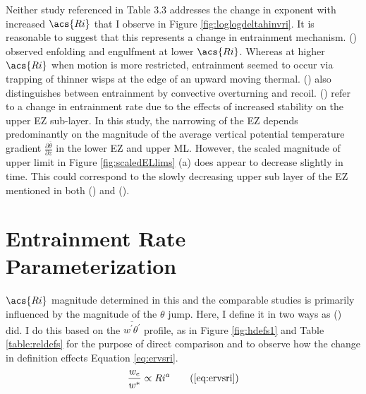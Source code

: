 Neither study referenced in Table 3.3 addresses the change in exponent with increased $\acs{Ri}$ that I observe in Figure \ref{fig:loglogdeltahinvri}.  It is reasonable to suggest that this represents a change in entrainment mechanism. \citeauthor{SullMoengStev} (\citeyear{SullMoengStev}) observed enfolding and engulfment at lower $\acs{Ri}$.  Whereas at higher $\acs{Ri}$ when motion is more restricted, entrainment seemed to occur via trapping of thinner wisps at the edge of an upward moving thermal.  \citeauthor{Turner86} (\citeyear{Turner86}) also distinguishes between entrainment by convective overturning and recoil. \citeauthor{GarciaMellado} (\citeyear{GarciaMellado}) refer to a change in entrainment rate due to the effects of increased stability on the upper \acs{EZ} sub-layer.  In this study, the narrowing of the \acs{EZ} depends predominantly on the magnitude of the average vertical potential temperature gradient $\frac{\partial \overline{\theta}}{\partial z}$ in the lower \acs{EZ} and upper \acs{ML}.  However, the scaled magnitude of upper limit in Figure \ref{fig:scaledELlims} (a) does appear to decrease slightly in time.  This could correspond to the slowly decreasing upper sub layer of the \acs{EZ} mentioned in both \citeauthor{GarciaMellado} (\citeyear{GarciaMellado}) and \citeauthor{FedConzMir04} (\citeyear{FedConzMir04}).\\

\section{Entrainment Rate Parameterization}

$\acs{Ri}$ magnitude determined in this and the comparable studies is primarily influenced by the magnitude of the $\theta$ jump.  Here, I define it in two ways as \citeauthor{FedConzMir04} (\citeyear{FedConzMir04}) did.  I do this based on the $\overline{w^{'}\theta^{'}}$ profile, as in Figure \ref{fig:hdefs1} and Table \ref{table:reldefs} for the purpose of direct comparison and to observe how the change in definition effects Equation \ref{eq:ervsri}.\\

\begin{equation}
\frac{w_{e}}{w^{*}} \propto Ri^{a} \tag{\ref{eq:ervsri}}
\end{equation}

